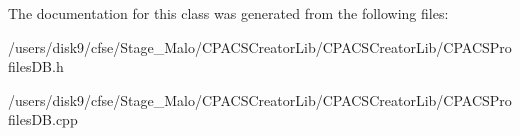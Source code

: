 The documentation for this class was generated from the following files\-:\begin{DoxyCompactItemize}
\item 
/users/disk9/cfse/\-Stage\-\_\-\-Malo/\-C\-P\-A\-C\-S\-Creator\-Lib/\-C\-P\-A\-C\-S\-Creator\-Lib/C\-P\-A\-C\-S\-Profiles\-D\-B.\-h\item 
/users/disk9/cfse/\-Stage\-\_\-\-Malo/\-C\-P\-A\-C\-S\-Creator\-Lib/\-C\-P\-A\-C\-S\-Creator\-Lib/C\-P\-A\-C\-S\-Profiles\-D\-B.\-cpp\end{DoxyCompactItemize}
